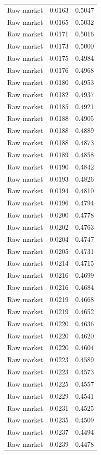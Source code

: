 \begin{table}[htbp]
\begin{tabular}{lll}
Raw market & 0.0163 & 0.5047 \\
Raw market & 0.0165 & 0.5032 \\
Raw market & 0.0171 & 0.5016 \\
Raw market & 0.0173 & 0.5000 \\
Raw market & 0.0175 & 0.4984 \\
Raw market & 0.0176 & 0.4968 \\
Raw market & 0.0180 & 0.4953 \\
Raw market & 0.0182 & 0.4937 \\
Raw market & 0.0185 & 0.4921 \\
Raw market & 0.0188 & 0.4905 \\
Raw market & 0.0188 & 0.4889 \\
Raw market & 0.0188 & 0.4873 \\
Raw market & 0.0189 & 0.4858 \\
Raw market & 0.0190 & 0.4842 \\
Raw market & 0.0193 & 0.4826 \\
Raw market & 0.0194 & 0.4810 \\
Raw market & 0.0196 & 0.4794 \\
Raw market & 0.0200 & 0.4778 \\
Raw market & 0.0202 & 0.4763 \\
Raw market & 0.0204 & 0.4747 \\
Raw market & 0.0205 & 0.4731 \\
Raw market & 0.0214 & 0.4715 \\
Raw market & 0.0216 & 0.4699 \\
Raw market & 0.0216 & 0.4684 \\
Raw market & 0.0219 & 0.4668 \\
Raw market & 0.0219 & 0.4652 \\
Raw market & 0.0220 & 0.4636 \\
Raw market & 0.0220 & 0.4620 \\
Raw market & 0.0220 & 0.4604 \\
Raw market & 0.0223 & 0.4589 \\
Raw market & 0.0223 & 0.4573 \\
Raw market & 0.0225 & 0.4557 \\
Raw market & 0.0229 & 0.4541 \\
Raw market & 0.0231 & 0.4525 \\
Raw market & 0.0235 & 0.4509 \\
Raw market & 0.0237 & 0.4494 \\
Raw market & 0.0239 & 0.4478 \\

\end{tabular}
\end{table}
